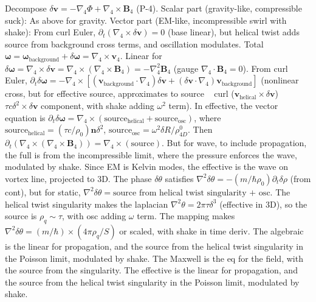 Decompose $\delta\mathbf{v} = - \nabla_4 \Phi + \nabla_4 \times \mathbf{B}_4$ (P-4). Scalar part (gravity-like, compressible suck): As above for gravity. Vector part (EM-like, incompressible swirl with shake): From curl Euler, $\partial_t (\nabla_4 \times \delta\mathbf{v}) = 0$ (base linear), but helical twist adds source from background cross terms, and oscillation modulates. Total $\boldsymbol{\omega} = \boldsymbol{\omega}_{\text{background}} + \delta\boldsymbol{\omega} = \nabla_4 \times \mathbf{v}_4$. Linear for $\delta\boldsymbol{\omega} = \nabla_4 \times \delta\mathbf{v} = \nabla_4 \times (\nabla_4 \times \mathbf{B}_4) = - \nabla_4^2 \mathbf{B}_4$ (gauge $\nabla_4 \cdot \mathbf{B}_4 = 0$). From curl Euler, $\partial_t \delta\boldsymbol{\omega} = - \nabla_4 \times [(\mathbf{v}_{\text{background}} \cdot \nabla_4) \delta\mathbf{v} + (\delta\mathbf{v} \cdot \nabla_4) \mathbf{v}_{\text{background}}]$ (nonlinear cross, but for effective source, approximates to source ~ curl ($\mathbf{v}_{\text{helical}} \times \delta\mathbf{v}$) ~ $\tau c \delta^2 \times \delta\mathbf{v}$ component, with shake adding $\omega^2$ term). In effective, the vector equation is $\partial_t \delta\boldsymbol{\omega} = \nabla_4 \times (\text{source}_{\text{helical}} + \text{source}_{\text{osc}})$, where $\text{source}_{\text{helical}} = (\tau c / \rho_0) \mathbf{n} \delta^2$, $\text{source}_\text{osc} = \omega^2 \delta R / \rho_{4D}^0$. Then $\partial_t (\nabla_4 \times (\nabla_4 \times \mathbf{B}_4)) = \nabla_4 \times (\text{source})$. But for wave, to include propagation, the full is from the incompressible limit, where the pressure enforces the wave, modulated by shake. Since EM is Kelvin modes, the effective is the wave on vortex line, projected to 3D. The phase $\delta\theta$ satisfies $\nabla^2 \delta\theta = - (m / \hbar \rho_0) \partial_t \delta\rho$ (from cont), but for static, $\nabla^2 \delta\theta = \text{source from helical twist singularity + osc}$. The helical twist singularity makes the laplacian $\nabla^2 \theta = 2\pi \tau \delta^3$ (effective in 3D), so the source is $\rho_q \sim \tau$, with osc adding $\omega$ term. The mapping makes $\nabla^2 \delta\theta = (m / \hbar) \times (4\pi \rho_q / S)$ or scaled, with shake in time deriv. The algebraic is the linear for propagation, and the source from the helical twist singularity in the Poisson limit, modulated by shake. The Maxwell is the eq for the field, with the source from the singularity. The effective is the linear for propagation, and the source from the helical twist singularity in the Poisson limit, modulated by shake.

